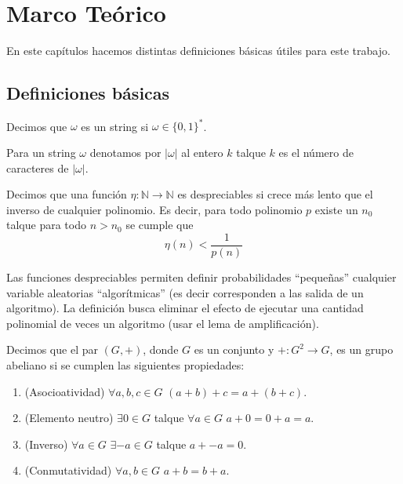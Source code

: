 \chapter{Marco Teórico}

En este capítulos hacemos distintas definiciones básicas útiles
para este trabajo.

\section{Definiciones básicas}

\begin{definicion}[String]
Decimos que $\omega$ es un string si $\omega \in \{0,1\}^*$.
\end{definicion}

\begin{definicion}
Para un string $\omega$ denotamos por $|\omega|$ al entero $k$
talque $k$ es el número de caracteres de $|\omega|$.
\end{definicion}

\begin{definicion}
Decimos que una función $\eta: \mathbb{N} \to \mathbb{N}$ es despreciables
si crece más lento que el inverso de cualquier polinomio. Es decir, para
todo polinomio $p$ existe
un $n_0$ talque para todo $n > n_0$ se cumple que
$$\eta(n) < \frac{1}{p(n)}$$
\end{definicion}
Las funciones despreciables permiten definir probabilidades ``pequeñas'' cualquier
variable aleatorias ``algorítmicas'' (es decir corresponden a las salida de un algoritmo).
La definición busca eliminar el efecto de ejecutar una cantidad polinomial de veces un
algoritmo (usar el lema de amplificación).

\begin{definicion}
Decimos que el par $(G,+)$, donde $G$ es un conjunto y
$+:G^2 \to G$, es un grupo abeliano si se cumplen las siguientes propiedades:
\begin{enumerate}
\item (Asocioatividad) $\forall a,b,c \in G$ $(a+b)+c=a+(b+c)$.
\item (Elemento neutro) $\exists 0 \in G$ talque $\forall a \in G$ $a+0 = 0+a = a$.
\item (Inverso) $\forall a \in G$ $\exists -a \in G$ talque $a+-a = 0$.
\item (Conmutatividad) $\forall a,b \in G$ $a+b = b+a$.
\end{enumerate}
\end{definicion}

